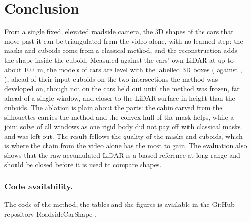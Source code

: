 \documentclass[runningheads,a4paper]{llncs}
\begin{document}
\section{Conclusion}

From a single fixed, elevated roadside camera, the 3D shapes of the cars that move past it can be triangulated from
the video alone, with no learned step: the masks and cuboids come from a classical method, and the reconstruction
adds the shape inside the cuboid. Measured against the cars' own LiDAR at up to about 100~m, the models of
\ClsTCars{} cars are level with the labelled 3D boxes (\ClsTOurs{} against \ClsTLab{}, \ClsTDLab{}), ahead of their input cuboids on the two intersections the method was developed on, though not on the \ClsHCars{} cars held out until the method was frozen, far ahead of a single window, and closer
to the LiDAR surface in height than the cuboids. The ablation is plain about the parts: the cabin carved from the
silhouettes carries the method and the convex hull of the mask helps, while a joint solve of all windows as one
rigid body did not pay off with classical masks and was left out. The result follows the quality of the masks and cuboids, which is where the chain from the video
alone has the most to gain. The evaluation also shows that the raw accumulated LiDAR is a biased reference at long
range and should be closed before it is used to compare shapes.

\subsubsection*{Code availability.} The code of the method, the tables and the figures is available in
the GitHub repository RoadsideCarShape \cite{code}.



\end{document}
